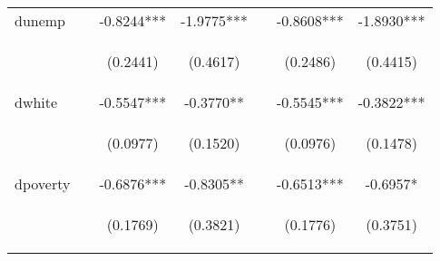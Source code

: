 \begin{center}
\begin{tabular}{lcccccc}
dunemp &  & -0.8244*** & -1.9775*** &  & -0.8608*** & -1.8930*** \\
\vspace{4pt} & \begin{footnotesize}\end{footnotesize} & \begin{footnotesize}(0.2441)\end{footnotesize} & \begin{footnotesize}(0.4617)\end{footnotesize} & \begin{footnotesize}\end{footnotesize} & \begin{footnotesize}(0.2486)\end{footnotesize} & \begin{footnotesize}(0.4415)\end{footnotesize} \\
dwhite &  & -0.5547*** & -0.3770** &  & -0.5545*** & -0.3822*** \\
\vspace{4pt} & \begin{footnotesize}\end{footnotesize} & \begin{footnotesize}(0.0977)\end{footnotesize} & \begin{footnotesize}(0.1520)\end{footnotesize} & \begin{footnotesize}\end{footnotesize} & \begin{footnotesize}(0.0976)\end{footnotesize} & \begin{footnotesize}(0.1478)\end{footnotesize} \\
dpoverty &  & -0.6876*** & -0.8305** &  & -0.6513*** & -0.6957* \\
\vspace{4pt} & \begin{footnotesize}\end{footnotesize} & \begin{footnotesize}(0.1769)\end{footnotesize} & \begin{footnotesize}(0.3821)\end{footnotesize} & \begin{footnotesize}\end{footnotesize} & \begin{footnotesize}(0.1776)\end{footnotesize} & \begin{footnotesize}(0.3751)\end{footnotesize} \\

\end{tabular}
\end{center}
